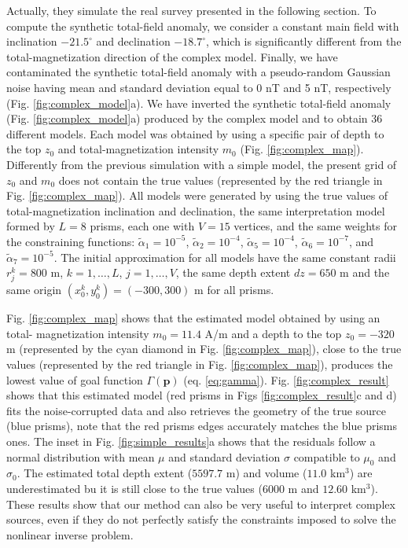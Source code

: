 Actually, they simulate the real survey presented in the following section. To compute the synthetic total-field anomaly, we consider a constant main field with inclination $ -21.5^\circ $ and declination $ -18.7^\circ $, which is significantly different from the total-magnetization direction of the complex model. Finally, we have
contaminated the synthetic total-field anomaly with a pseudo-random Gaussian noise having mean and standard deviation equal to 0 nT and 5 nT, respectively (Fig. \ref{fig:complex_model}a). We have inverted the synthetic total-field anomaly (Fig. \ref{fig:complex_model}a) produced by the complex model and to obtain 36 different models. Each model was obtained by using a specific pair of depth to the top $ z_0 $
and total-magnetization intensity $ m_0 $ (Fig. \ref{fig:complex_map}). Differently from the previous simulation with a simple model, the present grid of $ z_0 $ and $ m_0 $ does not contain the true values (represented by the red triangle in Fig. \ref{fig:complex_map}). All models were generated by using the true values of total-magnetization inclination and declination, the same interpretation model formed by $ L = 8 $ prisms, each one with $ V = 15 $ vertices, and the same weights for the constraining functions: $\tilde{\alpha}_1 = 10^{-5}$, $\tilde{\alpha}_2 = 10^{-4}$, $\tilde{\alpha}_5 = 10^{-4}$, $\tilde{\alpha}_6 = 10^{-7}$, and $\tilde{\alpha}_7 = 10^{-5}$. The initial approximation for all models have the same constant radii $ r^k_j = 800 $ m, $ k = 1, \dots, L $, $ j = 1, \dots, V $, the same depth extent $ dz = 650 $ m and the same origin $ (x^k_0, y^k_0) = (-300, 300) $ m for all prisms.

Fig. \ref{fig:complex_map} shows that the estimated model obtained by using an total- magnetization intensity $ m_0 = 11.4 $ A/m and a depth to the top $ z_0 = -320 $ m (represented by the cyan diamond in Fig. \ref{fig:complex_map}), close to the true values (represented by the red triangle in Fig. \ref{fig:complex_map}), produces the lowest value of goal function $ \Gamma(\mathbf{p}) $ (eq. \ref{eq:gamma}). Fig. \ref{fig:complex_result} shows that this estimated model (red prisms in Figs \ref{fig:complex_result}c and d) fits the noise-corrupted data and also retrieves the geometry of the true source (blue prisms), note that the red prisms edges accurately matches the blue prisms ones. The inset in Fig. \ref{fig:simple_results}a shows that the residuals follow a normal distribution with mean $ \mu $ and standard deviation $ \sigma $ compatible to $ \mu_0 $ and $ \sigma_0 $. The estimated total depth extent ($ 5597.7 $ m) and volume ($ 11.0 $ km$^3 $) are underestimated bu it is still close to the true values ($ 6000 $ m and $ 12.60 $ km$^3 $). These results show that our method can also be very useful to interpret complex sources, even if they do not perfectly satisfy the constraints imposed to solve the nonlinear inverse problem.